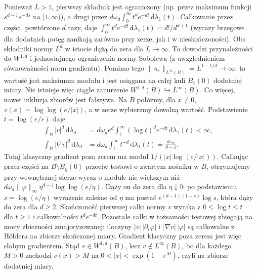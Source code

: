 \begin{kontrprzyklad}
Ponieważ $L>1$, pierwszy składnik jest ograniczony
(np. przez maksimum funkcji $s^{d-1}e^{-ds}$ na $[1,\infty)$),
a drugi przez $d\omega_d\int_0^\infty t^de^{-dt}\,\mathrm d\lambda_1(t)$.
Całkowanie przez części, powtórzone $d$ razy, daje
$\int_0^\infty t^de^{-dt}\,\mathrm d\lambda_1(t)
=d!/d^{d+1}$ (wyrazy brzegowe dla dodatnich potęg
zanikają zarówno przy zerze, jak i w nieskończoności).
Oba składniki normy $L^d$ w istocie dążą do zera
dla $L\to\infty$.
To dowodzi przynależności do $W^{1,d}$ i jednostajnego
ograniczenia normy Sobolewa (z uwzględnieniem
równoważności norm gradientu).
Pomimo tego
$\|u_\varepsilon\|_{L^\infty(B)}=L^{1-1/d}\to\infty$:
ta wartość jest maksimum modułu i jest osiągana
na całej kuli $B_\varepsilon(0)$ dodatniej miary.
Nie istnieje więc ciągłe zanurzenie
$W^{1,d}(B)\hookrightarrow L^\infty(B)$.
Co więcej, nawet inkluzja zbiorów jest fałszywa.
Na $B$ połóżmy, dla $x\ne0$,
$v(x)=\log\log(e/|x|)$, a w zerze wybierzmy dowolną wartość.
Podstawienie $t=\log(e/r)$ daje
\begin{align*}
 \int_B |v|^d\,\mathrm d\lambda_d
 &=d\omega_d e^d\int_1^\infty(\log t)^d e^{-dt}
                     \,\mathrm d\lambda_1(t)<\infty,\\
 \int_B|\nabla v|^d\,\mathrm d\lambda_d
 &=d\omega_d\int_1^\infty t^{-d}\,\mathrm d\lambda_1(t)
 =\frac{d\omega_d}{d-1}.
\end{align*}
Tutaj klasyczny gradient poza zerem ma moduł
$1/(|x|\log(e/|x|))$. Całkując przez części na
$B\setminus\overline{B_\eta(0)}$ przeciw testowi
o zwartym nośniku w $B$, otrzymujemy przy wewnętrznej
sferze wyraz o module nie większym niż
$d\omega_d\|\varphi\|_\infty\eta^{d-1}\log\log(e/\eta)$.
Dąży on do zera dla $\eta\downarrow0$: po podstawieniu
$s=\log(e/\eta)$ wyrażenie zależne od $\eta$ ma postać
$e^{(d-1)(1-s)}\log s$, która dąży do zera dla $d\ge2$.
Skończoność pierwszej całki normy $v$ wynika z
$0\le\log t\le t$ dla $t\ge1$ i całkowalności
$t^de^{-dt}$. Pozostałe całki w tożsamości testowej
zbiegają na mocy zbieżności zmajoryzowanej:
iloczyny $|v|\,|\partial_i\varphi|$ i
$|\nabla v|\,|\varphi|$ są całkowalne z Höldera
na zbiorze skończonej miary.
Gradient klasyczny poza zerem jest więc słabym gradientem.
Stąd $v\in W^{1,d}(B)$, lecz $v\notin L^\infty(B)$,
bo dla każdego $M>0$ zachodzi $v(x)>M$ na
$0<|x|<\exp(1-e^M)$, czyli na zbiorze dodatniej
miary.
\end{kontrprzyklad}

